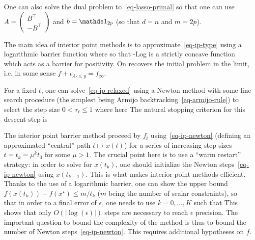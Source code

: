 \begin{exmp}
	One can also solve the dual problem to~\eqref{eq-lasso-primal}
	so that one can use $A=\begin{pmatrix} B^\top \\-B^\top \end{pmatrix}$ and $b = \ones_{2p}$ (so that $d=n$ and $m=2p$).
\end{exmp}

The main idea of interior point methods is to approximate~\eqref{eq-ip-type} using a logarithmic barrier function
where 
so that -Log is a strictly concave function which acts as a barrier for positivity. 
%
On recovers the initial problem in the limit, i.e. in some sense $f + \iota_{A \cdot \leq y} = f_\infty$. 

For a fixed $t$, one can solve~\eqref{eq-ip-relaxed} using a Newton method with some line search procedure (the simplest being Armijo backtracking~\eqref{eq-armijo-rule}) to select the step size $0<\tau_\ell\leq 1$
where here
The natural stopping criterion for this descent step is 


The interior point barrier method proceed by $f_t$ using~\eqref{eq-ip-newton} (defining an approximated ``central'' path $t \mapsto x(t)$) for a series of increasing step sizes $t=t_k=\mu^k t_0$ for some $\mu > 1$.
%
The crucial point here is to use a ``warm restart'' strategy: in order to solve for $x(t_{k})$, one should initialize the Newton steps~\eqref{eq-ip-newton} using $x(t_{k-1})$. This is what makes interior point methods efficient.   
%
Thanks to the use of a logarithmic barrier, one can show the upper bound $f(x(t_k))-f(x^\star) \leq m/t_k$ ($m$ being the number of scalar constraints), so that in order to a final error of $\epsilon$, one needs to use $k=0, \ldots, K$ such that 
This shows that only $O(|\log(\epsilon)|)$ steps are necessary to reach $\epsilon$ precision. The important question to bound the complexity of the method is thus to bound the number of Newton steps~\eqref{eq-ip-newton}. This requires additional hypotheses on $f$.


